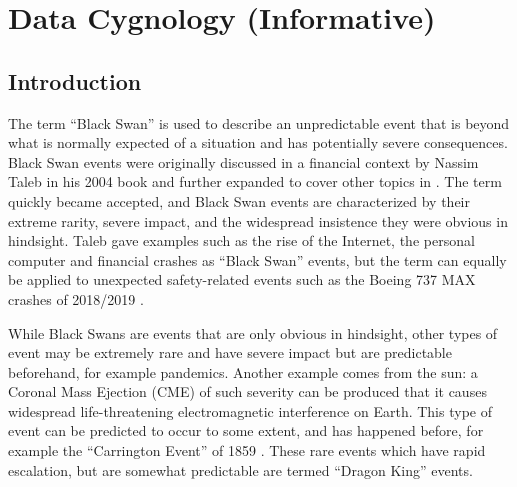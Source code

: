 %
\section{Data Cygnology (Informative)}\label{bkm:cygnology}
%

\subsection{Introduction}
The term “Black Swan” is used to describe an unpredictable event that is beyond what is normally expected of a situation and has potentially severe consequences.
Black Swan events were originally discussed in a financial context by Nassim Taleb in his 2004 book
 \cite{citation:cyg:RoleOfChance}
and further expanded to cover other topics in
\cite{citation:cyg:BlackSwan}.
The term quickly became accepted, and Black Swan events are characterized by their extreme rarity, severe impact, and the widespread insistence they were obvious in hindsight. Taleb gave examples such as the rise of the Internet, the personal computer and financial crashes as “Black Swan” events, but the term can equally be applied to unexpected safety-related events such as the Boeing 737 MAX crashes of 2018/2019 \cite{citation:cyg:737Max}.

While Black Swans are events that are only obvious in hindsight, other types of event may be extremely rare and have severe impact but are predictable beforehand, for example pandemics.
Another example comes from the sun:  a Coronal Mass Ejection (CME) of such severity can be produced that it causes widespread life-threatening electromagnetic interference on Earth.
This type of event can be predicted to occur to some extent, and has happened before, for example the “Carrington Event” of 1859 \cite{citation:cyg:carrington}.
These rare events which have rapid escalation, but are somewhat predictable are termed “Dragon King” events.

